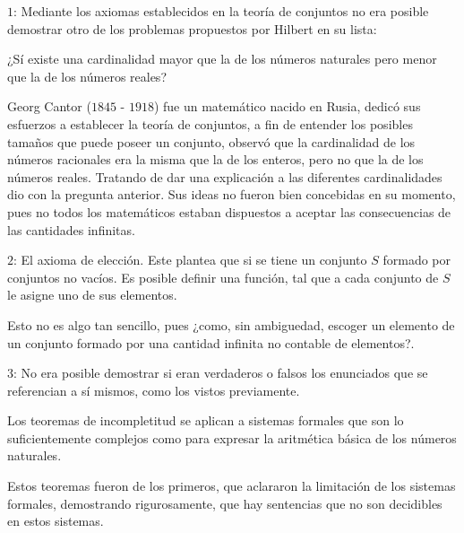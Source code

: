 \documentclass[14pt]{extarticle}
\begin{document}
$1$: Mediante los axiomas establecidos en la teoría de conjuntos no era posible demostrar otro de los problemas propuestos por Hilbert en su lista: 

¿Sí existe una cardinalidad mayor que la de los números naturales pero menor que la de los números reales?
    
Georg Cantor ($1845$ - $1918$) fue un matemático nacido en Rusia, dedicó sus esfuerzos a establecer la teoría de conjuntos, a fin de entender los posibles tamaños que puede poseer un conjunto, observó que la cardinalidad de los números racionales era la misma que la de los enteros, pero no que la de los números reales. Tratando de dar una explicación a las diferentes cardinalidades dio con la pregunta anterior. Sus ideas no fueron bien concebidas en su momento, pues no todos los matemáticos estaban dispuestos a aceptar las consecuencias de las cantidades infinitas. \cite{cantor}

$2$: El axioma de elección. Este plantea que si se tiene un conjunto $S$ formado por conjuntos no vacíos. Es posible definir una función, tal que a cada conjunto de $S$ le asigne uno de sus elementos. \cite{choice}

Esto no es algo tan sencillo, pues ¿como, sin ambiguedad, escoger un elemento de un conjunto formado por una cantidad infinita no contable de elementos?.

$3$: No era posible demostrar si eran verdaderos o falsos los enunciados que se referencian a sí mismos, como los vistos previamente.

Los teoremas de incompletitud se aplican a sistemas formales que son lo suficientemente complejos como para expresar la aritmética básica de los números naturales. 

Estos teoremas fueron de los primeros, que aclararon la limitación de los sistemas formales, demostrando rigurosamente, que hay sentencias que no son decidibles en estos sistemas.



\end{document}
